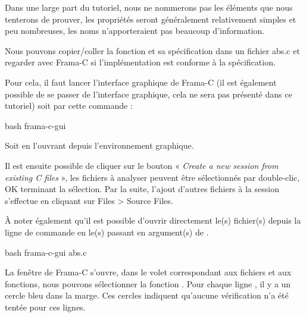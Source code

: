


Dans une large part du tutoriel, nous ne nommerons pas les éléments que nous
tenterons de prouver, les propriétés seront généralement relativement simples
et peu nombreuses, les noms n'apporteraient pas beaucoup d'information.



Nous pouvons copier/coller la fonction  et sa spécification dans un
fichier abs.c et regarder avec Frama-C si l'implémentation est conforme à la
spécification.



Pour cela, il faut lancer l'interface graphique de Frama-C (il est également
possible de se passer de l'interface graphique, cela ne sera pas présenté
dans ce tutoriel) soit par cette commande :



\begin{CodeBlock}{bash}
frama-c-gui
\end{CodeBlock}



Soit en l'ouvrant depuis l'environnement graphique.



Il est ensuite possible de cliquer sur le bouton « \textit{Create a new session from
existing C files} », les fichiers à analyser peuvent être sélectionnés par
double-clic, OK terminant la sélection. Par la suite, l'ajout d'autres
fichiers à la session s'effectue en cliquant sur Files > Source Files.



À noter également qu'il est possible d'ouvrir directement le(s) fichier(s)
depuis la ligne de commande en le(s) passant en argument(s) de .



\begin{CodeBlock}{bash}
frama-c-gui abs.c
\end{CodeBlock}





La fenêtre de Frama-C s'ouvre, dans le volet correspondant aux fichiers et aux
fonctions, nous pouvons sélectionner la fonction .
Pour chaque ligne , il y a un cercle bleu dans la marge.
Ces cercles indiquent qu'aucune vérification n'a été tentée pour ces lignes.



